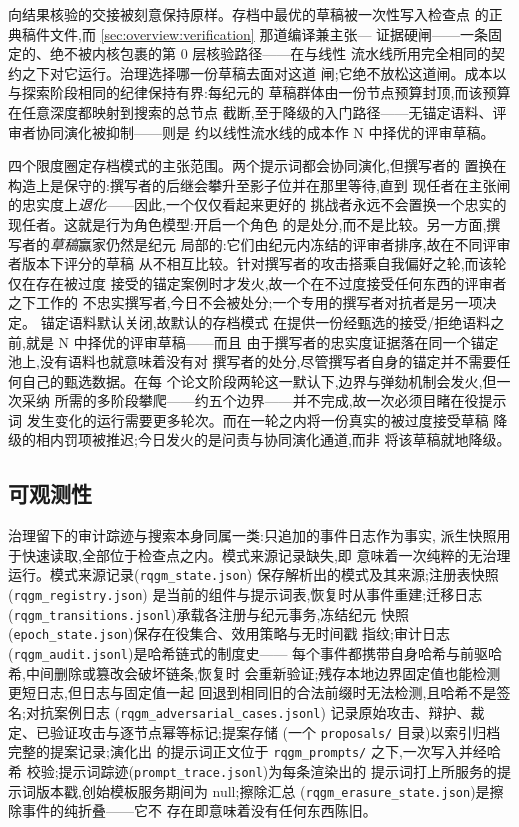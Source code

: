 向结果核验的交接被刻意保持原样。存档中最优的草稿被一次性写入检查点
的正典稿件文件,而 \cref{sec:overview:verification} 那道编译兼主张—
证据硬闸——一条固定的、绝不被内核包裹的第 0 层核验路径——在与线性
流水线所用完全相同的契约之下对它运行。治理选择哪一份草稿去面对这道
闸;它绝不放松这道闸。成本以与探索阶段相同的纪律保持有界:每纪元的
草稿群体由一份节点预算封顶,而该预算在任意深度都映射到搜索的总节点
截断,至于降级的入门路径——无锚定语料、评审者协同演化被抑制——则是
约以线性流水线的成本作 N 中择优的评审草稿。

四个限度圈定存档模式的主张范围。两个提示词都会协同演化,但撰写者的
置换在构造上是保守的:撰写者的后继会攀升至影子位并在那里等待,直到
现任者在主张闸的忠实度上\emph{退化}——因此,一个仅仅看起来更好的
挑战者永远不会置换一个忠实的现任者。这就是行为角色模型:开启一个角色
的是处分,而不是比较。另一方面,撰写者的\emph{草稿}赢家仍然是纪元
局部的:它们由纪元内冻结的评审者排序,故在不同评审者版本下评分的草稿
从不相互比较。针对撰写者的攻击搭乘自我偏好之轮,而该轮仅在存在被过度
接受的锚定案例时才发火,故一个在不过度接受任何东西的评审者之下工作的
不忠实撰写者,今日不会被处分;一个专用的撰写者对抗者是另一项决定。
锚定语料默认关闭,故默认的存档模式
在提供一份经甄选的接受/拒绝语料之前,就是 N 中择优的评审草稿——而且
由于撰写者的忠实度证据落在同一个锚定池上,没有语料也就意味着没有对
撰写者的处分,尽管撰写者自身的锚定并不需要任何自己的甄选数据。在每
个论文阶段两轮这一默认下,边界与弹劾机制会发火,但一次采纳
所需的多阶段攀爬——约五个边界——并不完成,故一次必须目睹在役提示词
发生变化的运行需要更多轮次。而在一轮之内将一份真实的被过度接受草稿
降级的相内罚项被推迟;今日发火的是问责与协同演化通道,而非
将该草稿就地降级。

\subsection{可观测性}\label{sec:rqgm:observability}

治理留下的审计踪迹与搜索本身同属一类:只追加的事件日志作为事实,
派生快照用于快速读取,全部位于检查点之内。模式来源记录缺失,即
意味着一次纯粹的无治理运行。模式来源记录(\texttt{rqgm\_state.json})
保存解析出的模式及其来源;注册表快照(\texttt{rqgm\_registry.json})
是当前的组件与提示词表,恢复时从事件重建;迁移日志
(\texttt{rqgm\_transitions.jsonl})承载各注册与纪元事务,冻结纪元
快照(\texttt{epoch\_state.json})保存在役集合、效用策略与无时间戳
指纹;审计日志(\texttt{rqgm\_audit.jsonl})是哈希链式的制度史——
每个事件都携带自身哈希与前驱哈希,中间删除或篡改会破坏链条,恢复时
会重新验证;残存本地边界固定值也能检测更短日志,但日志与固定值一起
回退到相同旧的合法前缀时无法检测,且哈希不是签名;对抗案例日志
(\texttt{rqgm\_adversarial\_cases.jsonl})
记录原始攻击、辩护、裁定、已验证攻击与逐节点幂等标记;提案存储
(一个 \texttt{proposals/} 目录)以索引归档完整的提案记录;演化出
的提示词正文位于 \texttt{rqgm\_prompts/} 之下,一次写入并经哈希
校验;提示词踪迹(\texttt{prompt\_trace.jsonl})为每条渲染出的
提示词打上所服务的提示词版本戳,创始模板服务期间为 null;擦除汇总
(\texttt{rqgm\_erasure\_state.json})是擦除事件的纯折叠——它不
存在即意味着没有任何东西陈旧。

